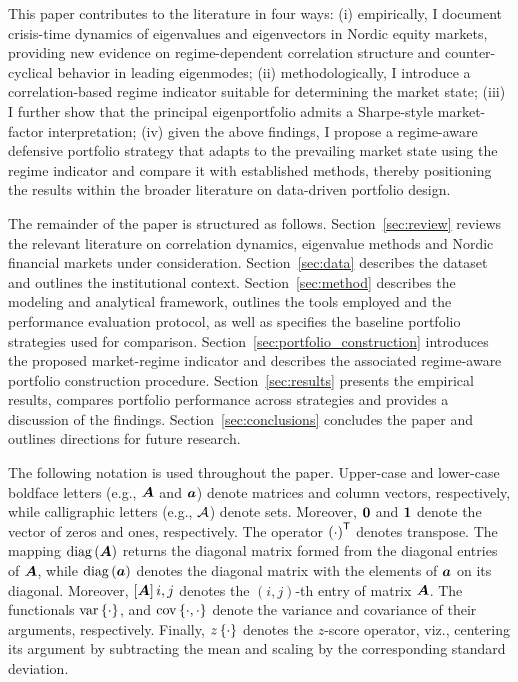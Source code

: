 \documentclass[pdflatex,sn-basic]{sn-jnl}%
\theoremstyle{thmstyleone}%
\theoremstyle{thmstyletwo}%
\theoremstyle{thmstylethree}%
\begin{document}
This paper contributes to the literature in four ways: 
(i) empirically, I document crisis-time dynamics of eigenvalues and eigenvectors in Nordic equity markets, 
providing new evidence on regime-dependent correlation structure and counter-cyclical behavior in leading eigenmodes;
(ii) methodologically, I introduce a correlation-based regime indicator suitable for determining the market state;
(iii) I further show that the principal eigenportfolio admits a Sharpe-style market-factor interpretation;
(iv) given the above findings, I propose a regime-aware defensive portfolio strategy that adapts to the 
prevailing market state using the regime indicator and compare it with established 
methods, thereby positioning the results within the broader literature on data-driven portfolio design.

The remainder of the paper is structured as follows. 
Section~\ref{sec:review} reviews the relevant literature on correlation dynamics, eigenvalue methods and Nordic financial markets under consideration. 
Section~\ref{sec:data} describes the dataset and outlines the institutional context. 
Section~\ref{sec:method} describes the modeling and analytical framework, outlines the tools employed and the performance evaluation protocol, as well as specifies the baseline portfolio strategies used for comparison.
Section~\ref{sec:portfolio_construction} introduces the proposed market-regime indicator and describes the associated regime-aware portfolio construction procedure.
Section~\ref{sec:results} presents the empirical results, compares portfolio performance across strategies and provides a discussion of the findings.
Section~\ref{sec:conclusions} concludes the paper and outlines directions for future research.

The following notation is used throughout the paper. Upper-case and lower-case boldface letters (e.g., $\boldsymbol{A}$ and $\boldsymbol{a}$) denote matrices and column vectors, respectively, while calligraphic letters (e.g., $\mathcal{A}$) denote sets. Moreover, $\boldsymbol{0}$ and $\boldsymbol{1}$ denote the vector of zeros and ones, respectively. The operator $\left( \cdot \right)^{\textnormal{\textsf{T}}}$ denotes transpose. The mapping $\operatorname{diag}\left( \boldsymbol{A} \right)$ returns the diagonal matrix formed from the diagonal entries of $\boldsymbol{A}$, while $\operatorname{diag}\left( \boldsymbol{a} \right)$ denotes the diagonal matrix with the elements of $\boldsymbol{a}$ on its diagonal. Moreover, $\left[ \boldsymbol{A} \right]{i,j}$ denotes the $(i,j)$-th entry of matrix $\boldsymbol{A}$. The functionals $\mathrm{var}\left\{ \cdot \right\}$, and $\mathrm{cov}\left\{ \cdot,\cdot \right\}$ denote the variance and covariance of their arguments, respectively. Finally, $z\left\{ \cdot \right\}$ denotes the $z$-score operator, viz., centering its argument by subtracting the mean and scaling by the corresponding standard deviation.
\end{document}
